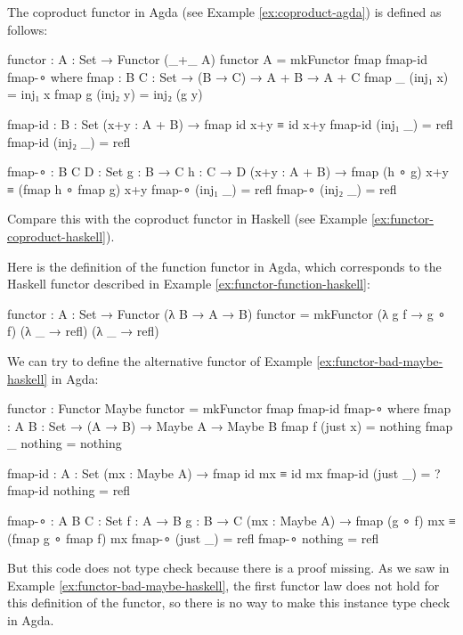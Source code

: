 \begin{example}
  \label{ex:functor-coproduct-agda}

  The coproduct functor in Agda (see Example \ref{ex:coproduct-agda})
  is defined as follows:
  \begin{codeagda}
functor : {A : Set} → Functor (_+_ A)
functor {A} = mkFunctor fmap fmap-id fmap-∘
  where
    fmap : {B C : Set} → (B → C) → A + B → A + C
    fmap _ (inj₁ x) = inj₁ x
    fmap g (inj₂ y) = inj₂ (g y)

    fmap-id : {B : Set} (x+y : A + B) → fmap id x+y ≡ id x+y
    fmap-id (inj₁ _) = refl
    fmap-id (inj₂ _) = refl

    fmap-∘ : {B C D : Set} {g : B → C} {h : C → D}
             (x+y : A + B) → fmap (h ∘ g) x+y ≡ (fmap h ∘ fmap g) x+y
    fmap-∘ (inj₁ _) = refl
    fmap-∘ (inj₂ _) = refl
  \end{codeagda}
  Compare this with the coproduct functor in Haskell (see Example
  \ref{ex:functor-coproduct-haskell}).

\end{example}

\begin{example}
  \label{ex:functor-function-agda}

  Here is the definition of the function functor in Agda, which
  corresponds to the Haskell functor described in Example
  \ref{ex:functor-function-haskell}:
  \begin{codeagda}
functor : {A : Set} → Functor (λ B → A → B)
functor = mkFunctor (λ g f → g ∘ f) (λ _ → refl) (λ _ → refl)
  \end{codeagda}

\end{example}

\begin{example}
  \label{ex:functor-bad-maybe-agda}

  We can try to define the alternative  functor of
  Example \ref{ex:functor-bad-maybe-haskell} in Agda:
  \begin{codeagda}
functor : Functor Maybe
functor = mkFunctor fmap fmap-id fmap-∘
  where
    fmap : {A B : Set} → (A → B) → Maybe A → Maybe B
    fmap f (just x) = nothing
    fmap _ nothing  = nothing

    fmap-id : {A : Set} (mx : Maybe A) → fmap id mx ≡ id mx
    fmap-id (just _) = ?
    fmap-id nothing  = refl

    fmap-∘ : {A B C : Set} {f : A → B} {g : B → C}
             (mx : Maybe A) → fmap (g ∘ f) mx ≡ (fmap g ∘ fmap f) mx
    fmap-∘ (just _) = refl
    fmap-∘ nothing  = refl
  \end{codeagda}
  But this code does not type check because there is a proof missing.
  As we saw in Example \ref{ex:functor-bad-maybe-haskell}, the first
  functor law does not hold for this definition of the
   functor, so there is no way to make this instance
  type check in Agda.

\end{example}

